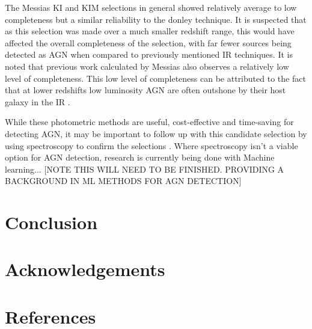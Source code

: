 \documentclass[11pt]{iopart}
\begin{document}
The Messias KI and KIM selections in general showed relatively average to low completeness but a similar reliability to the donley technique. It is suspected that as this selection was made over a much smaller redshift range, this would have affected the overall completeness of the selection, with far fewer sources being detected as AGN when compared to previously mentioned IR techniques. It is noted that previous work calculated by Messias \cite{messias_new_2012, messias_dependency_2014} also observes a relatively low level of completeness. This low level of completeness can be attributed to the fact that at lower redshifts low luminosity AGN are often outshone by their host galaxy in the IR \cite{messias_dependency_2014}. 


While these photometric methods are useful, cost-effective and time-saving for detecting AGN, it may be important to follow up with this candidate selection by using spectroscopy to confirm the selections \cite{hainline_spectroscopic_2014}. Where spectroscopy isn't a viable option for AGN detection, research is currently being done with Machine learning... [NOTE THIS WILL NEED TO BE FINISHED. PROVIDING A BACKGROUND IN ML METHODS FOR AGN DETECTION]


\newpage
\section{Conclusion}
\newpage
\section*{Acknowledgements}
\newpage
\section*{References}



\end{document}
